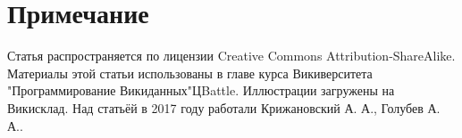 \section{Примечание}

Статья распространяется по лицензии Creative Commons Attribution-ShareAlike. Материалы этой статьи использованы в главе курса Викиверситета "Программирование Викиданных"{ЦBattle}. Иллюстрации загружены на Викисклад. Над статьёй в 2017 году работали Крижановский А. А., Голубев А. А..